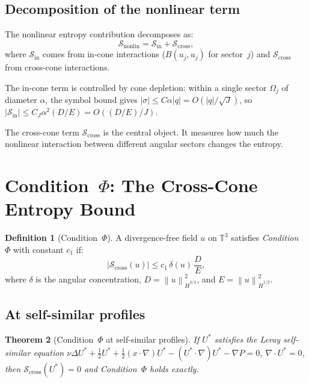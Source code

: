 \documentclass[11pt]{article}
\newtheorem{theorem}{Theorem}[section]
\theoremstyle{definition}
\newtheorem{definition}[theorem]{Definition}
\newcommand{\T}{\mathbb{T}}
\newcommand{\norm}[1]{\left\| #1 \right\|}
\newcommand{\Hdot}[1]{\dot{H}^{#1}}
\newcommand{\cS}{\mathcal{S}}
\begin{document}
\subsection{Decomposition of the nonlinear term}

The nonlinear entropy contribution decomposes as:
\begin{equation}\label{eq:nonlin-decomp}
\cS_{\mathrm{nonlin}} = \cS_{\mathrm{in}}
+ \cS_{\mathrm{cross}},
\end{equation}
where $\cS_{\mathrm{in}}$ comes from in-cone interactions
($B(u_j,u_j)$ for sector~$j$) and $\cS_{\mathrm{cross}}$
from cross-cone interactions.

The in-cone term is controlled by cone depletion:
within a single sector $\Omega_j$ of diameter $\alpha$,
the symbol bound gives $|\sigma| \leq C\alpha|q|
= O(|q|/\sqrt{J})$, so
$|\cS_{\mathrm{in}}| \leq C_J\alpha^2(D/E)
= O((D/E)/J)$.

The cross-cone term $\cS_{\mathrm{cross}}$ is the central
object.  It measures how much the nonlinear interaction
between different angular sectors changes the entropy.


\section{Condition~$\Phi$: The Cross-Cone Entropy Bound}
\label{sec:condition-phi}

\begin{definition}[Condition~$\Phi$]
\label{def:condition-phi}
A divergence-free field $u$ on $\T^3$ satisfies
\emph{Condition~$\Phi$} with constant $c_1$ if:
\begin{equation}\label{eq:condition-phi}
|\cS_{\mathrm{cross}}(u)|
\leq c_1\,\delta(u)\,\frac{D}{E},
\end{equation}
where $\delta$ is the angular concentration,
$D = \norm{u}_{\Hdot{3/2}}^2$, and
$E = \norm{u}_{\Hdot{1/2}}^2$.
\end{definition}


\subsection{At self-similar profiles}

\begin{theorem}[Condition~$\Phi$ at self-similar profiles]
\label{thm:self-similar}
If $U^*$ satisfies the Leray self-similar equation
$\nu\Delta U^* + \frac{1}{2}U^* + \frac{1}{2}(x\cdot\nabla)U^*
- (U^*\cdot\nabla)U^* - \nabla P = 0$, $\nabla\cdot U^* = 0$,
then $\cS_{\mathrm{cross}}(U^*) = 0$ and Condition~$\Phi$
holds exactly.
\end{theorem}
\end{document}
